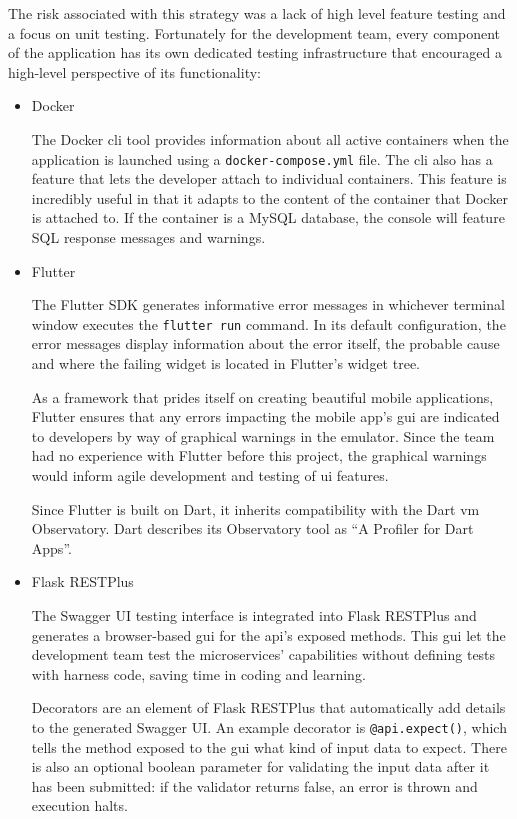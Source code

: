 \documentclass{article}
\begin{document}
    The risk associated with this strategy was a lack of high level feature testing and a focus on unit testing. Fortunately for the development team, every component of the application has its own dedicated testing infrastructure that encouraged a high-level perspective of its functionality:
    
    \begin{itemize}
        \item Docker \par
        The Docker \acrshort{cli} tool provides information about all active containers when the application is launched using a \texttt{docker-compose.yml} file. The \acrshort{cli} also has a feature that lets the developer attach to individual containers. This feature is incredibly useful in that it adapts to the content of the container that Docker is attached to. If the container is a MySQL database, the console will feature SQL response messages and warnings. \par
        
        \item Flutter \par
        The Flutter SDK generates informative error messages in whichever terminal window executes the \texttt{flutter run} command. In its default configuration, the error messages display information about the error itself, the probable cause and where the failing widget is located in Flutter's widget tree. \par
        As a framework that prides itself on creating beautiful mobile applications, Flutter ensures that any errors impacting the mobile app's \acrshort{gui} are indicated to developers by way of graphical warnings in the emulator. Since the team had no experience with Flutter before this project, the graphical warnings would inform agile development and testing of \acrshort{ui} features. \par
        Since Flutter is built on Dart, it inherits compatibility with the Dart \acrshort{vm} Observatory. Dart describes its Observatory tool as ``A Profiler for Dart Apps''\cite{dartvmobservatorydocs}. \par
        
        \item Flask RESTPlus \par

        The Swagger UI testing interface is integrated into Flask RESTPlus and generates a browser-based \acrshort{gui} for the \acrshort{api}'s exposed methods. This \acrshort{gui} let the development team test the microservices' capabilities without defining tests with harness code, saving time in coding and learning. \par
        Decorators are an element of Flask RESTPlus that automatically add details to the generated Swagger UI. An example decorator is \texttt{@api.expect()}, which tells the method exposed to the \acrshort{gui} what kind of input data to expect. There is also an optional boolean parameter for validating the input data after it has been submitted: if the validator returns false, an error is thrown and execution halts. \par


\end{itemize}
\end{document}
